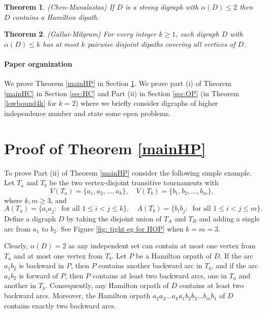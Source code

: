 \documentclass{article}
\newcommand{\2}{\vspace{2mm}}
\newtheorem{theorem}{Theorem}[section]
\theoremstyle{definition}
\begin{document}
\begin{theorem} \label{HamPath}\cite{chen_manalastas_1983} (Chen-Manalastas)
 If $D$ is a strong digraph with $\alpha(D) \leq 2$ then $D$ contains a Hamilton dipath.
\end{theorem}


\begin{theorem}\cite{PathPartition} (Gallai-Milgram) \label{PathPartition} For every integer $k\ge 1$,
each digraph $D$ with $\alpha(D) \le k$ has at most $k$ pairwise disjoint dipaths covering all vertices of $D$.
\end{theorem}

\paragraph{Paper organization} We prove Theorem \ref{mainHP}  in Section \ref{sec:HP}.  We prove part (i) of Theorem \ref{mainHC}  in Section \ref{sec:HC} and Part (ii) in Section \ref{sec:OP} (in Theorem \ref{lowbound4k} for $k=2$) where we briefly consider digraphs of higher independence number and state some open problems.



\section{Proof of Theorem \ref{mainHP}}\label{sec:HP}

To prove Part (ii) of Theorem \ref{mainHP} consider the following simple example.
Let $T_a$ and $T_b$ be the  two vertex-disjoint transitive tournaments with
\[
V(T_a)=\{a_1,a_2,\dots,a_k\},\quad 
V(T_b)=\{b_1,b_2,\dots,b_m\},
\]
where $k,m\ge 3$, and 
\[
A(T_a)=\{a_ia_j:\ \text{ for all } 1\le i<j\le k\}, \quad 
A(T_b)=\{b_ib_j:\ \text{ for all } 1\le i<j\le m\}.
\]
Define a digraph $D$ by taking the disjoint union of $T_A$ and $T_B$ and adding a single arc from $a_1$ to $b_2$. See Figure \ref{fig: tight eg for HOP} when $k=m=3$.

Clearly, $\alpha(D)=2$ as any independent set can contain at most one vertex from $T_a$ and at most one vertex from $T_b$. Let $P$ be a Hamilton orpath of $D$. If the arc $a_1b_2$ is backward in $P$, then $P$ contains another backward arc in $T_b$, and if the arc $a_1b_2$ is forward of $P$, then $P$ contains at least two backward arcs, one in $T_a$ and another in $T_b$.
Consequently, any Hamilton orpath of $D$ contains at least two backward arcs. Moreover, the Hamilton orpath $a_2a_3 \dots a_k a_1 b_2 b_3 \dots b_m b_1$ of $D$ contains exactly two backward arcs. 
\end{document}
